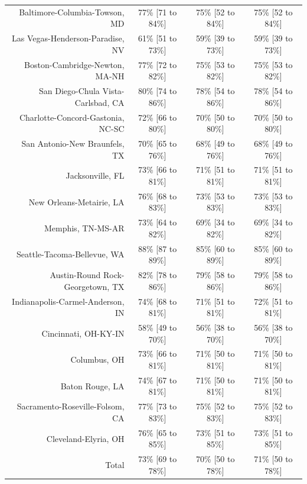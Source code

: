 \documentclass{article}
\begin{document}
\begin{table}[H]
\begin{tabular}{|r|c|c|c|}
		Baltimore-Columbia-Towson, MD & 77\% [71 to 84\%] & 75\% [52 to 84\%] & 75\% [52 to 84\%]\\
		Las Vegas-Henderson-Paradise, NV & 61\% [51 to 73\%] & 59\% [39 to 73\%] & 59\% [39 to 73\%]\\
		Boston-Cambridge-Newton, MA-NH & 77\% [72 to 82\%] & 75\% [53 to 82\%] & 75\% [53 to 82\%]\\
		San Diego-Chula Vista-Carlsbad, CA & 80\% [74 to 86\%] & 78\% [54 to 86\%] & 78\% [54 to 86\%]\\
		Charlotte-Concord-Gastonia, NC-SC & 72\% [66 to 80\%] & 70\% [50 to 80\%] & 70\% [50 to 80\%]\\
		San Antonio-New Braunfels, TX & 70\% [65 to 76\%] & 68\% [49 to 76\%] & 68\% [49 to 76\%]\\
		Jacksonville, FL & 73\% [66 to 81\%] & 71\% [51 to 81\%] & 71\% [51 to 81\%]\\
		New Orleans-Metairie, LA & 76\% [68 to 83\%] & 73\% [53 to 83\%] & 73\% [53 to 83\%]\\
		Memphis, TN-MS-AR & 73\% [64 to 82\%] & 69\% [34 to 82\%] & 69\% [34 to 82\%]\\
		Seattle-Tacoma-Bellevue, WA & 88\% [87 to 89\%] & 85\% [60 to 89\%] & 85\% [60 to 89\%]\\
		Austin-Round Rock-Georgetown, TX & 82\% [78 to 86\%] & 79\% [58 to 86\%] & 79\% [58 to 86\%]\\
		Indianapolis-Carmel-Anderson, IN & 74\% [68 to 81\%] & 71\% [51 to 81\%] & 72\% [51 to 81\%]\\
		Cincinnati, OH-KY-IN & 58\% [49 to 70\%] & 56\% [38 to 70\%] & 56\% [38 to 70\%]\\
		Columbus, OH & 73\% [66 to 81\%] & 71\% [50 to 81\%] & 71\% [50 to 81\%]\\
		Baton Rouge, LA & 74\% [67 to 81\%] & 71\% [50 to 81\%] & 71\% [50 to 81\%]\\
		Sacramento-Roseville-Folsom, CA & 77\% [73 to 83\%] & 75\% [52 to 83\%] & 75\% [52 to 83\%]\\
		Cleveland-Elyria, OH & 76\% [65 to 85\%] & 73\% [51 to 85\%] & 73\% [51 to 85\%]\\
		\hline
		Total & 73\% [69 to 78\%] & 70\% [50 to 78\%] & 71\% [50 to 78\%]\\
		\hline
	\end{tabular}
\end{table}




\end{document}
